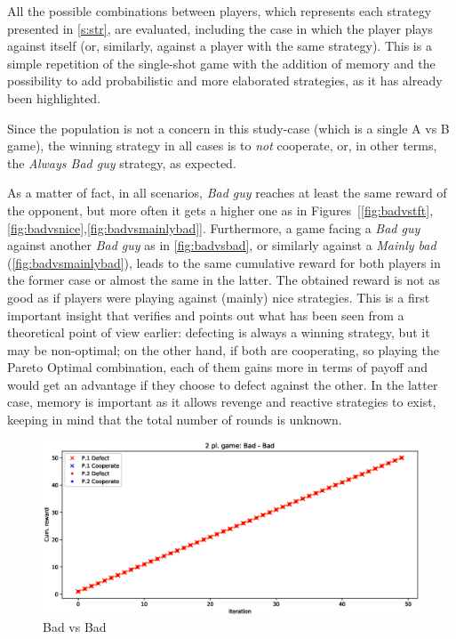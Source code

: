 \documentclass[journal,10pt,twoside]{IEEEtran}
\begin{document}
All the possible combinations between players, which represents each strategy presented in \autoref{s:str}, are evaluated, including the case in which the player plays against itself (or, similarly, against a player with the same strategy).
This is a simple repetition of the single-shot game with the addition of memory and the possibility to add probabilistic and more elaborated strategies, as it has already been highlighted.

Since the population is not a concern in this study-case (which is a single A vs B game), the winning strategy in all cases is to \textit{not} cooperate, or, in other terms, the \textit{Always Bad guy} strategy, as expected.

As a matter of fact, in all scenarios, \textit{Bad guy} reaches at least the same reward of the opponent, but more often it gets a higher one as in Figures~[\ref{fig:badvstft},\ref{fig:badvsnice},\ref{fig:badvsmainlybad}]. 
Furthermore, a game facing a \textit{Bad guy} against another \textit{Bad guy} as in \autoref{fig:badvsbad}, or similarly against a \textit{Mainly bad} (\autoref{fig:badvsmainlybad}), leads to the same cumulative reward for both players in the former case or almost the same in the latter. The obtained reward is not as good as if players were playing against (mainly) nice strategies.
This is a first important insight that verifies and points out what has been seen from a theoretical point of view earlier: defecting is always a winning strategy, but it may be non-optimal; on the other hand, if both are cooperating, so playing the Pareto Optimal combination, each of them gains more in terms of payoff and would get an advantage if they choose to defect against the other. In the latter case, memory is important as it allows revenge and reactive strategies to exist, keeping in mind that the total number of rounds is unknown. 

\begin{figure}[!ht]
    \centering
    \includegraphics[width=1\columnwidth]{../img/ipd2p/ipd2p-rewards-Bad-Bad}
    \caption{Bad vs Bad}
    \label{fig:badvsbad}
\end{figure}
\end{document}
